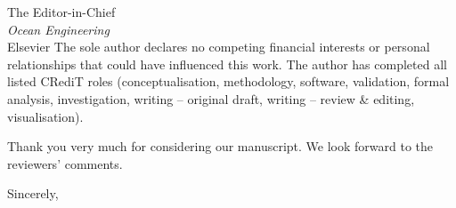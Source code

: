 \documentclass[11pt,a4paper]{letter}
\begin{document}
\begin{letter}{The Editor-in-Chief \\ \textit{Ocean Engineering} \\ Elsevier}
The sole author declares no competing financial interests or
personal relationships that could have influenced this work. The
author has completed all listed CRediT roles
(conceptualisation, methodology, software, validation, formal
analysis, investigation, writing -- original draft, writing --
review \& editing, visualisation).

Thank you very much for considering our manuscript. We look forward
to the reviewers' comments.

\closing{Sincerely,}

\end{letter}
\end{document}

